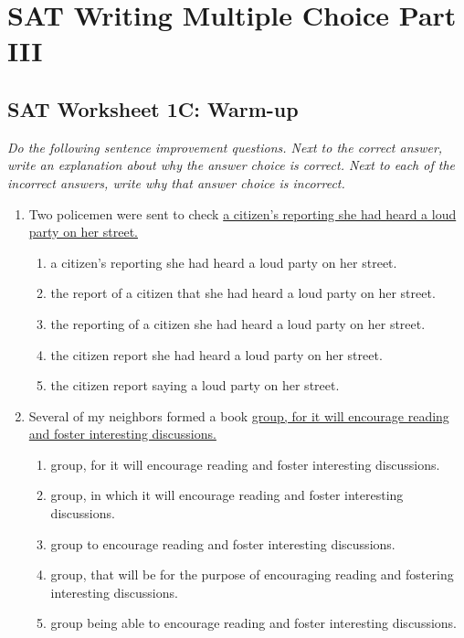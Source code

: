 \chapter[Multiple Choice Part III]{SAT Writing Multiple Choice Part III}
\section{SAT Worksheet 1C: Warm-up}

\textit{Do the following sentence improvement questions. Next to the correct answer, write an explanation about why the answer choice is correct. Next to each of the incorrect answers, write why that answer choice is incorrect.}

\begin{enumerate}
\item Two policemen were sent to check \ul{a citizen's reporting she had heard a loud party on her street.}

\begin{enumerate}[label=(\Alph*)]
\item a citizen's reporting she had heard a loud party on her street. 
\item the report of a citizen that she had heard a loud party on her street.
\item the reporting of a citizen she had heard a loud party on her street.
\item the citizen report she had heard a loud party on her street.
\item the citizen report saying a loud party on her street.
\end{enumerate}

\bigskip
\item Several of my neighbors formed a book \ul{group, for it will encourage reading and foster interesting discussions.}
\begin{enumerate}[label=(\Alph*)]
\item group, for it will encourage reading and foster interesting discussions.
\item group, in which it will encourage reading and foster interesting discussions.
\item group to encourage reading and foster interesting discussions.
\item group, that will be for the purpose of encouraging reading and fostering interesting discussions.
\item group being able to encourage reading and foster interesting discussions.
\end{enumerate}


\end{enumerate}
